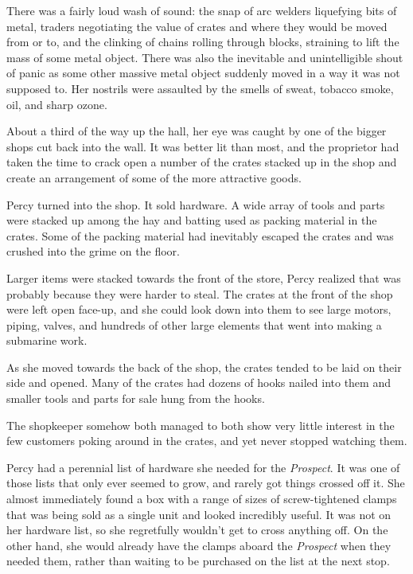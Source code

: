 \documentclass[
]{scrbook}
\begin{document}
There was a fairly loud wash of sound: the snap of arc welders
liquefying bits of metal, traders negotiating the value of crates and
where they would be moved from or to, and the clinking of chains rolling
through blocks, straining to lift the mass of some metal object. There
was also the inevitable and unintelligible shout of panic as some other
massive metal object suddenly moved in a way it was not supposed to. Her
nostrils were assaulted by the smells of sweat, tobacco smoke, oil, and
sharp ozone.

About a third of the way up the hall, her eye was caught by one of the
bigger shops cut back into the wall. It was better lit than most, and
the proprietor had taken the time to crack open a number of the crates
stacked up in the shop and create an arrangement of some of the more
attractive goods.

Percy turned into the shop. It sold hardware. A wide array of tools and
parts were stacked up among the hay and batting used as packing material
in the crates. Some of the packing material had inevitably escaped the
crates and was crushed into the grime on the floor.

Larger items were stacked towards the front of the store, Percy realized
that was probably because they were harder to steal. The crates at the
front of the shop were left open face-up, and she could look down into
them to see large motors, piping, valves, and hundreds of other large
elements that went into making a submarine work.

As she moved towards the back of the shop, the crates tended to be laid
on their side and opened. Many of the crates had dozens of hooks nailed
into them and smaller tools and parts for sale hung from the hooks.

The shopkeeper somehow both managed to both show very little interest in
the few customers poking around in the crates, and yet never stopped
watching them.

Percy had a perennial list of hardware she needed for the
\emph{Prospect}. It was one of those lists that only ever seemed to
grow, and rarely got things crossed off it. She almost immediately found
a box with a range of sizes of screw-tightened clamps that was being
sold as a single unit and looked incredibly useful. It was not on her
hardware list, so she regretfully wouldn't get to cross anything off. On
the other hand, she would already have the clamps aboard the
\emph{Prospect} when they needed them, rather than waiting to be
purchased on the list at the next stop.
\end{document}
